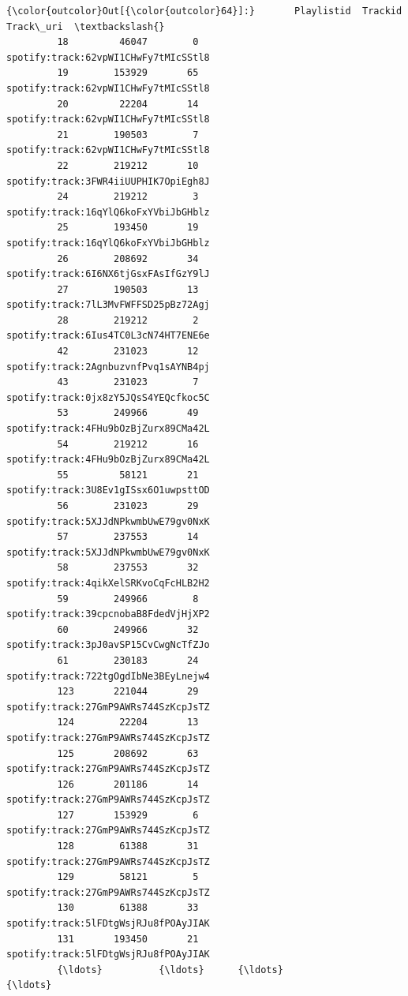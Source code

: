 \documentclass[11pt]{article}
\begin{document}
\begin{Verbatim}[commandchars=\\\{\}]
{\color{outcolor}Out[{\color{outcolor}64}]:}       Playlistid  Trackid                             Track\_uri  \textbackslash{}
         18         46047        0  spotify:track:62vpWI1CHwFy7tMIcSStl8   
         19        153929       65  spotify:track:62vpWI1CHwFy7tMIcSStl8   
         20         22204       14  spotify:track:62vpWI1CHwFy7tMIcSStl8   
         21        190503        7  spotify:track:62vpWI1CHwFy7tMIcSStl8   
         22        219212       10  spotify:track:3FWR4iiUUPHIK7OpiEgh8J   
         24        219212        3  spotify:track:16qYlQ6koFxYVbiJbGHblz   
         25        193450       19  spotify:track:16qYlQ6koFxYVbiJbGHblz   
         26        208692       34  spotify:track:6I6NX6tjGsxFAsIfGzY9lJ   
         27        190503       13  spotify:track:7lL3MvFWFFSD25pBz72Agj   
         28        219212        2  spotify:track:6Ius4TC0L3cN74HT7ENE6e   
         42        231023       12  spotify:track:2AgnbuzvnfPvq1sAYNB4pj   
         43        231023        7  spotify:track:0jx8zY5JQsS4YEQcfkoc5C   
         53        249966       49  spotify:track:4FHu9bOzBjZurx89CMa42L   
         54        219212       16  spotify:track:4FHu9bOzBjZurx89CMa42L   
         55         58121       21  spotify:track:3U8Ev1gISsx6O1uwpsttOD   
         56        231023       29  spotify:track:5XJJdNPkwmbUwE79gv0NxK   
         57        237553       14  spotify:track:5XJJdNPkwmbUwE79gv0NxK   
         58        237553       32  spotify:track:4qikXelSRKvoCqFcHLB2H2   
         59        249966        8  spotify:track:39cpcnobaB8FdedVjHjXP2   
         60        249966       32  spotify:track:3pJ0avSP15CvCwgNcTfZJo   
         61        230183       24  spotify:track:722tgOgdIbNe3BEyLnejw4   
         123       221044       29  spotify:track:27GmP9AWRs744SzKcpJsTZ   
         124        22204       13  spotify:track:27GmP9AWRs744SzKcpJsTZ   
         125       208692       63  spotify:track:27GmP9AWRs744SzKcpJsTZ   
         126       201186       14  spotify:track:27GmP9AWRs744SzKcpJsTZ   
         127       153929        6  spotify:track:27GmP9AWRs744SzKcpJsTZ   
         128        61388       31  spotify:track:27GmP9AWRs744SzKcpJsTZ   
         129        58121        5  spotify:track:27GmP9AWRs744SzKcpJsTZ   
         130        61388       33  spotify:track:5lFDtgWsjRJu8fPOAyJIAK   
         131       193450       21  spotify:track:5lFDtgWsjRJu8fPOAyJIAK   
         {\ldots}          {\ldots}      {\ldots}                                   {\ldots}   

\end{Verbatim}
\end{document}
